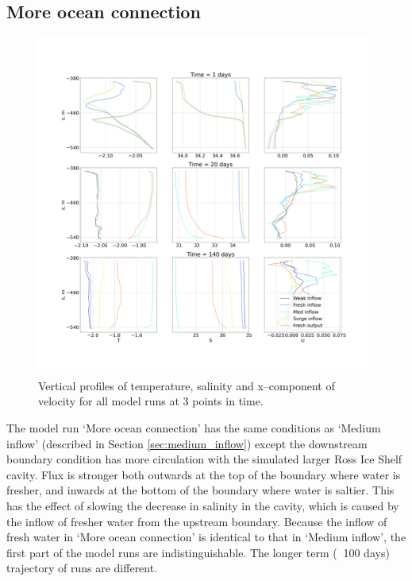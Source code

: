\subsection{More ocean connection} \label{sec:fresh_output}


\begin{figure}[!ht]
\centering
\includegraphics[width=1\textwidth]{chapters/4/compare_all_TSU.png}
\caption[All model runs comparison (T,S,U)]{Vertical profiles of temperature, salinity and x--component of velocity for all model runs at 3 points in time.}
\label{fig:compare_all_TSU}
\end{figure}

The model run `More ocean connection' has the same conditions  as `Medium inflow' (described in Section \ref{sec:medium_inflow})  except the downstream boundary condition has more circulation with the simulated larger Ross Ice Shelf cavity. Flux is stronger both outwards at the top of the boundary where water is fresher, and inwards at the bottom of the boundary where water is saltier. This has the effect of slowing the decrease in salinity in the cavity, which is caused by the inflow of fresher water from the upstream boundary. Because the inflow of fresh water in `More ocean connection' is identical to that in `Medium inflow', the first part of the model runs are indistinguishable. The longer term ($\>$ 100 days) trajectory of runs are different.

